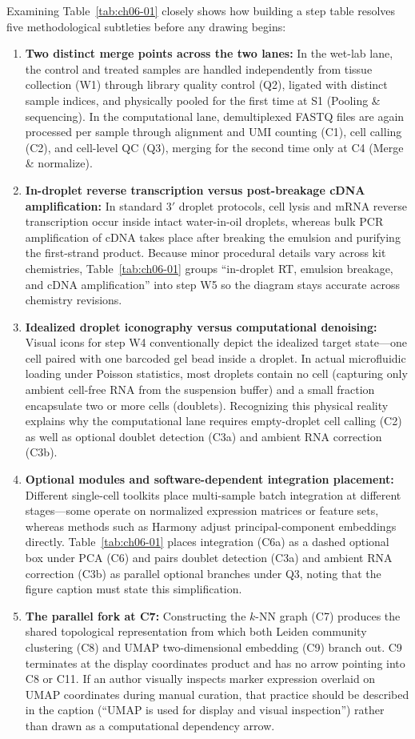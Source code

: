 Examining Table~\ref{tab:ch06-01} closely shows how building a step table resolves five methodological subtleties before any drawing begins:
\begin{enumerate}
\item \textbf{Two distinct merge points across the two lanes:} In the wet-lab lane, the control and treated samples are handled independently from tissue collection (W1) through library quality control (Q2), ligated with distinct sample indices, and physically pooled for the first time at S1 (Pooling \& sequencing). In the computational lane, demultiplexed FASTQ files are again processed per sample through alignment and UMI counting (C1), cell calling (C2), and cell-level QC (Q3), merging for the second time only at C4 (Merge \& normalize).
\item \textbf{In-droplet reverse transcription versus post-breakage cDNA amplification:} In standard 3$'$ droplet protocols, cell lysis and mRNA reverse transcription occur inside intact water-in-oil droplets, whereas bulk PCR amplification of cDNA takes place after breaking the emulsion and purifying the first-strand product. Because minor procedural details vary across kit chemistries, Table~\ref{tab:ch06-01} groups ``in-droplet RT, emulsion breakage, and cDNA amplification'' into step W5 so the diagram stays accurate across chemistry revisions.
\item \textbf{Idealized droplet iconography versus computational denoising:} Visual icons for step W4 conventionally depict the idealized target state—one cell paired with one barcoded gel bead inside a droplet. In actual microfluidic loading under Poisson statistics, most droplets contain no cell (capturing only ambient cell-free RNA from the suspension buffer) and a small fraction encapsulate two or more cells (doublets). Recognizing this physical reality explains why the computational lane requires empty-droplet cell calling (C2) as well as optional doublet detection (C3a) and ambient RNA correction (C3b).
\item \textbf{Optional modules and software-dependent integration placement:} Different single-cell toolkits place multi-sample batch integration at different stages—some operate on normalized expression matrices or feature sets, whereas methods such as Harmony adjust principal-component embeddings directly. Table~\ref{tab:ch06-01} places integration (C6a) as a dashed optional box under PCA (C6) and pairs doublet detection (C3a) and ambient RNA correction (C3b) as parallel optional branches under Q3, noting that the figure caption must state this simplification.
\item \textbf{The parallel fork at C7:} Constructing the $k$-NN graph (C7) produces the shared topological representation from which both Leiden community clustering (C8) and UMAP two-dimensional embedding (C9) branch out. C9 terminates at the display coordinates product and has no arrow pointing into C8 or C11. If an author visually inspects marker expression overlaid on UMAP coordinates during manual curation, that practice should be described in the caption (``UMAP is used for display and visual inspection'') rather than drawn as a computational dependency arrow.
\end{enumerate}

